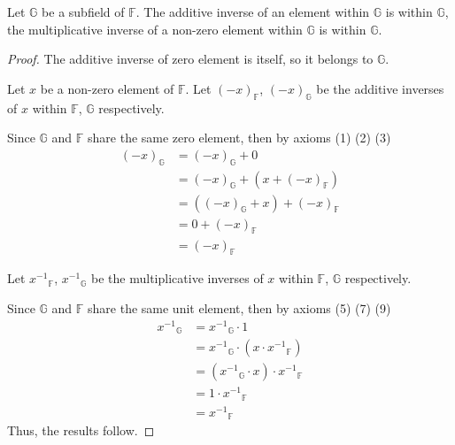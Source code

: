 \begin{theorem}\label{thm:inverse-elements-of-subfield}
	Let $\mathbb{G}$ be a subfield of $\mathbb{F}$. The additive inverse of an element within $\mathbb{G}$ is within $\mathbb{G}$, the multiplicative inverse of a non-zero element within $\mathbb{G}$ is within $\mathbb{G}$.
\end{theorem}

\begin{proof}
	The additive inverse of zero element is itself, so it belongs to $\mathbb{G}$.

	Let $x$ be a non-zero element of $\mathbb{F}$. Let ${(-x)}_{\mathbb{F}}$, ${(-x)}_{\mathbb{G}}$ be the additive inverses of $x$ within $\mathbb{F}$, $\mathbb{G}$ respectively.

	Since $\mathbb{G}$ and $\mathbb{F}$ share the same zero element, then by axioms (1) (2) (3)
	\begin{align*}
		{(-x)}_{\mathbb{G}} & = {(-x)}_{\mathbb{G}} + 0                         \\
		                    & = {(-x)}_{\mathbb{G}} + (x + {(-x)}_{\mathbb{F}}) \\
		                    & = ({(-x)}_{\mathbb{G}} + x) + {(-x)}_{\mathbb{F}} \\
		                    & = 0 + {(-x)}_{\mathbb{F}}                         \\
		                    & = {(-x)}_{\mathbb{F}}
	\end{align*}

	Let ${x^{-1}}_{\mathbb{F}}$, ${x^{-1}}_{\mathbb{G}}$ be the multiplicative inverses of $x$ within $\mathbb{F}$, $\mathbb{G}$ respectively.

	Since $\mathbb{G}$ and $\mathbb{F}$ share the same unit element, then by axioms (5) (7) (9)
	\begin{align*}
		{x^{-1}}_{\mathbb{G}} & = {x^{-1}}_{\mathbb{G}}\cdot 1                              \\
		                      & = {x^{-1}}_{\mathbb{G}}\cdot (x\cdot {x^{-1}}_{\mathbb{F}}) \\
		                      & = ({x^{-1}}_{\mathbb{G}}\cdot x)\cdot {x^{-1}}_{\mathbb{F}} \\
		                      & = 1\cdot {x^{-1}}_{\mathbb{F}}                              \\
		                      & = {x^{-1}}_{\mathbb{F}}
	\end{align*}
	Thus, the results follow.
\end{proof}

